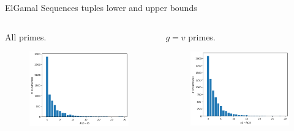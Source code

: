 \begin{frame}{ElGamal Sequences tuples lower and upper bounds}
    \begin{columns}
        \begin{column}{0.45\textwidth}
        \begin{center}
            All primes.
        \end{center}
            \begin{figure}
                \centering
                \includegraphics[width=\textwidth]{figures/LB0t2with012outliers.png}
            \end{figure}
        \end{column}
        \begin{column}{0.45\textwidth}
        \begin{center}
            $g = v$ primes.
        \end{center}
            \begin{figure}
                \centering
                \includegraphics[width=\textwidth]{figures/UBt2with005outliers.png}

\end{figure}
\end{column}
\end{columns}
\end{frame}
